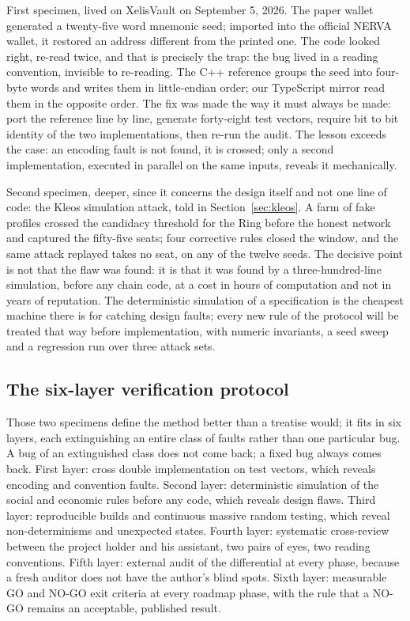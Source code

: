 First specimen, lived on XelisVault on September 5, 2026. The paper
wallet generated a twenty-five word mnemonic seed; imported into the
official NERVA wallet, it restored an address different from the printed
one. The code looked right, re-read twice, and that is precisely the
trap: the bug lived in a reading convention, invisible to re-reading.
The C++ reference groups the seed into four-byte words and writes them
in little-endian order; our TypeScript mirror read them in the opposite
order. The fix was made the way it must always be made: port the
reference line by line, generate forty-eight test vectors, require bit
to bit identity of the two implementations, then re-run the audit. The
lesson exceeds the case: an encoding fault is not found, it is crossed;
only a second implementation, executed in parallel on the same inputs,
reveals it mechanically.

Second specimen, deeper, since it concerns the design itself and not one
line of code: the Kleos simulation attack, told in
Section~\ref{sec:kleos}. A farm of fake profiles crossed the candidacy
threshold for the Ring before the honest network and captured the
fifty-five seats; four corrective rules closed the window, and the same
attack replayed takes no seat, on any of the twelve seeds. The decisive
point is not that the flaw was found: it is that it was found by a
three-hundred-line simulation, before any chain code, at a cost in
hours of computation and not in years of reputation. The deterministic
simulation of a specification is the cheapest machine there is for
catching design faults; every new rule of the protocol will be treated
that way before implementation, with numeric invariants, a seed sweep
and a regression run over three attack sets.

\subsection{The six-layer verification protocol}

Those two specimens define the method better than a treatise would; it
fits in six layers, each extinguishing an entire class of faults rather
than one particular bug. A bug of an extinguished class does not come
back; a fixed bug always comes back. First layer: cross double
implementation on test vectors, which reveals encoding and convention
faults. Second layer: deterministic simulation of the social and
economic rules before any code, which reveals design flaws. Third layer:
reproducible builds and continuous massive random testing, which reveal
non-determinisms and unexpected states. Fourth layer: systematic
cross-review between the project holder and his assistant, two pairs of
eyes, two reading conventions. Fifth layer: external audit of the
differential at every phase, because a fresh auditor does not have the
author's blind spots. Sixth layer: measurable GO and NO-GO exit criteria
at every roadmap phase, with the rule that a NO-GO remains an acceptable,
published result.

